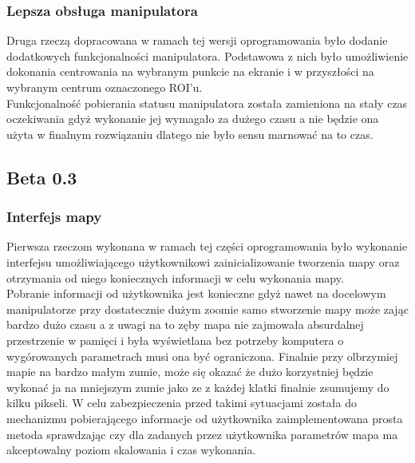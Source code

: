 \documentclass[11pt,a4paper]{article}
\begin{document}
    \subsubsection{Lepsza obsługa manipulatora}
    \hspace{1cm} Druga rzeczą dopracowana w ramach tej wersji oprogramowania było dodanie dodatkowych funkcjonalności manipulatora. Podstawowa z nich było umożliwienie dokonania centrowania na wybranym punkcie na ekranie i w przyszłości na wybranym centrum oznaczonego ROI'u.\\
    \hspace{1cm} Funkcjonalność pobierania statusu manipulatora została zamieniona na stały czas oczekiwania gdyż wykonanie jej wymagało za dużego czasu a nie będzie ona użyta w finalnym rozwiązaniu dlatego nie było sensu marnować na to czas.

    \subsection{Beta 0.3}

    \subsubsection{Interfejs mapy}
    \hspace{1cm} Pierwsza rzeczom wykonana w ramach tej części oprogramowania było wykonanie interfejsu umożliwiającego użytkownikowi zainicializowanie tworzenia mapy oraz otrzymania od niego koniecznych informacji w celu wykonania mapy.\\
    \hspace{1cm} Pobranie informacji od użytkownika jest konieczne gdyż nawet na docelowym manipulatorze przy dostatecznie dużym zoomie samo stworzenie mapy może zając bardzo dużo czasu a z uwagi na to zęby mapa nie zajmowała absurdalnej przestrzenie w pamięci i była wyświetlana bez potrzeby komputera o wygórowanych parametrach musi ona być ograniczona. Finalnie przy olbrzymiej mapie na bardzo małym zumie, może się okazać że dużo korzystniej będzie wykonać ja na mniejszym zumie jako ze z każdej klatki finalnie zsumujemy do kilku pikseli. W celu zabezpieczenia przed takimi sytuacjami została do mechanizmu pobierającego informacje od użytkownika zaimplementowana prosta metoda sprawdzając czy dla zadanych przez użytkownika parametrów mapa ma akceptowalny poziom skalowania i czas wykonania.\\
\end{document}
